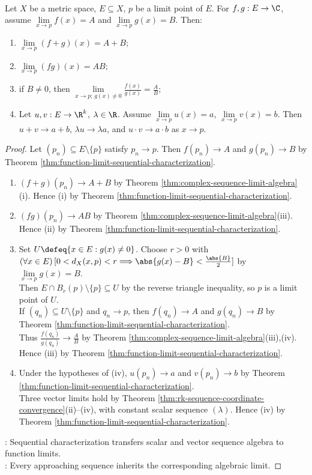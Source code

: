 \begin{theorem} \label{thm:function-limit-algebra} \\
Let $X$ be a metric space, $E\subseteq X$, $p$ be a limit point of $E$. For $f,g:E\to\C$, assume $\lim\limits_{x\to p}f(x)=A$ and $\lim\limits_{x\to p}g(x)=B$. Then:
\begin{enumerate}[label=(\roman*)]
\setlength{\itemsep}{0pt}
\item $\lim\limits_{x\to p}(f+g)(x)=A+B$;
\item $\lim\limits_{x\to p}(fg)(x)=AB$;
\item if $B\neq0$, then $\lim\limits_{x\to p;\,g(x)\neq0}\frac{f(x)}{g(x)}=\frac{A}{B}$;
\item Let $u,v:E\to\R^k$, $\lambda\in\R$. Assume $\lim\limits_{x\to p}u(x)=a$, $\lim\limits_{x\to p}v(x)=b$. Then $u+v\to a+b$, $\lambda u\to\lambda a$, and $u\cdot v\to a\cdot b$ as $x\to p$.
\end{enumerate}
\begin{proof}
Let $(p_n)\subseteq E\setminus\{p\}$ satisfy $p_n\to p$. Then $f(p_n)\to A$ and $g(p_n)\to B$ by Theorem \ref{thm:function-limit-sequential-characterization}.
\begin{enumerate}[label=(\roman*)]
\setlength{\itemsep}{0pt}
\item $(f+g)(p_n)\to A+B$ by Theorem \ref{thm:complex-sequence-limit-algebra}(i). Hence (i) by Theorem \ref{thm:function-limit-sequential-characterization}.
\item $(fg)(p_n)\to AB$ by Theorem \ref{thm:complex-sequence-limit-algebra}(iii). Hence (ii) by Theorem \ref{thm:function-limit-sequential-characterization}.
\item Set $U\defeq\{x\in E:g(x)\neq0\}$. Choose $r>0$ with $(\forall x\in E)\,[0<d_X(x,p)<r\Longrightarrow\abs{g(x)-B}<\frac{\abs{B}}{2}]$ by $\lim\limits_{x\to p}g(x)=B$.\\
Then $E\cap B_r(p)\setminus\{p\}\subseteq U$ by the reverse triangle inequality, so $p$ is a limit point of $U$.\\
If $(q_n)\subseteq U\setminus\{p\}$ and $q_n\to p$, then $f(q_n)\to A$ and $g(q_n)\to B$ by Theorem \ref{thm:function-limit-sequential-characterization}.\\
Thus $\frac{f(q_n)}{g(q_n)}\to\frac{A}{B}$ by Theorem \ref{thm:complex-sequence-limit-algebra}(iii),(iv). Hence (iii) by Theorem \ref{thm:function-limit-sequential-characterization}.
\item Under the hypotheses of (iv), $u(p_n)\to a$ and $v(p_n)\to b$ by Theorem \ref{thm:function-limit-sequential-characterization}.\\
Three vector limits hold by Theorem \ref{thm:rk-sequence-coordinate-convergence}(ii)--(iv), with constant scalar sequence $(\lambda)$. Hence (iv) by Theorem \ref{thm:function-limit-sequential-characterization}.
\end{enumerate}
: Sequential characterization transfers scalar and vector sequence algebra to function limits.\\
: Every approaching sequence inherits the corresponding algebraic limit.
\end{proof}
\end{theorem}

